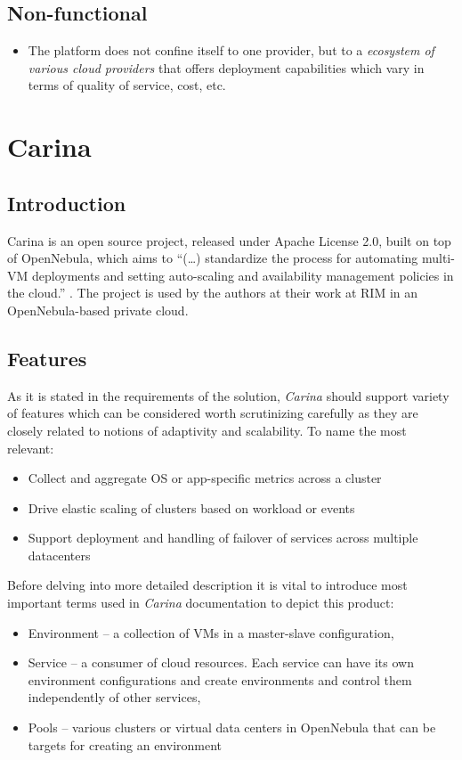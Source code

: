 \subsection{Non-functional}
\begin{itemize}
  \item The platform does not confine itself to one provider, but to a \emph{ecosystem of various cloud providers} that offers deployment capabilities which vary in terms of quality of service, cost, etc.
\end{itemize}
	
\section{Carina}

\subsection{Introduction}
Carina is an open source project, released under Apache License 2.0, built on top of OpenNebula, which aims to ``(\ldots) standardize the process for automating multi-VM deployments and setting auto-scaling and availability management policies in the cloud.'' \cite{CarinaBlog}. The project is used by the authors at their work at RIM in an OpenNebula-based private cloud.

\subsection{Features}
As it is stated in the requirements of the solution, \emph{Carina} should support variety of features which can be considered worth scrutinizing carefully as they are closely related to notions of adaptivity and scalability. To name the most relevant: \cite{CarinaBlog}
\begin{itemize}
  \item Collect and aggregate OS or app-specific metrics across a cluster
  \item Drive elastic scaling of clusters based on workload or events
  \item Support deployment and handling of failover of services across multiple datacenters
\end{itemize}

Before delving into more detailed description it is vital to introduce most important terms used in \emph{Carina} documentation to depict this product:
\begin{itemize}
  \item Environment -- a collection of VMs in a master-slave configuration,
  \item Service -- a consumer of cloud resources. Each service can have its own environment configurations and create environments and control them independently of other services,
  \item Pools -- various clusters or virtual data centers in OpenNebula that can be targets for creating an environment
\end{itemize}

